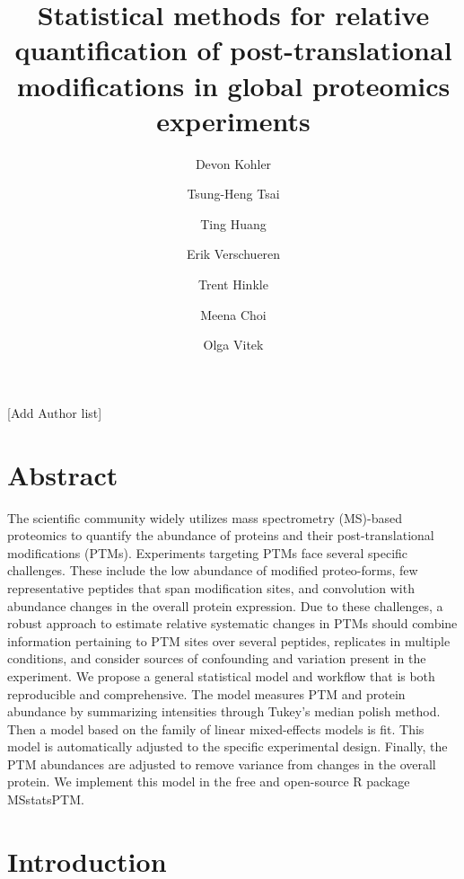 \documentclass[mcp]{article}
\title{Statistical methods for relative quantification of post-translational modifications in global proteomics experiments}
\author{
 Devon Kohler\\
 \and
 Tsung-Heng Tsai\\
 \and
 Ting Huang\\
 \and
 Erik Verschueren
 \and
 Trent Hinkle
 \and
  Meena Choi\\
 \and
 Olga Vitek
}
\date{}
\numberwithin{figure}{section} %
\numberwithin{table}{section}
\def\todo#1{{\color{red}[#1]}}
\begin{document}
\maketitle
\todo{Add Author list}
%


\section{Abstract}

The scientific community widely utilizes mass spectrometry (MS)-based proteomics to quantify the abundance of proteins and their post-translational modifications (PTMs). Experiments targeting PTMs face several specific challenges. These include the low abundance of modified proteo-forms, few representative peptides that span modification sites, and convolution with abundance changes in the overall protein expression. Due to these challenges, a robust approach to estimate relative systematic changes in PTMs should combine information pertaining to PTM sites over several peptides, replicates in multiple conditions, and consider sources of confounding and variation present in the experiment. We propose a general statistical model and workflow that is both reproducible and comprehensive. The model measures PTM and protein abundance by summarizing intensities through Tukey’s median polish method. Then a model based on the family of linear mixed-effects models is fit. This model is automatically adjusted to the specific experimental design. Finally, the PTM abundances are adjusted to remove variance from changes in the overall protein. We implement this model in the free and open-source R package MSstatsPTM.


\section{Introduction}
\end{document}
